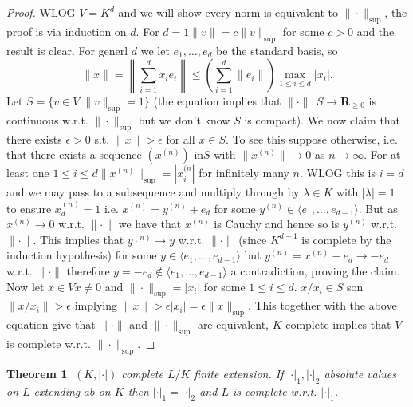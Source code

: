 \documentclass[10pt,]{book}
\newcommand{\gt}{>}
\theoremstyle{plain}
\newtheorem{theorem}{Theorem}[section]
\theoremstyle{definition}
\newcommand{\RR}{\mathbf{R}}
\newcommand{\ab}{|\cdot|}
\begin{document}
\begin{proof}

          WLOG \(V = K^d\) and we will show every norm is equivalent to \(\|\cdot\|_{\sup}\), the proof is via induction on \(d\).
          For \(d = 1\)\(\|v\| = c\|v\|_{\sup}\) for some \(c \gt 0\) and the result is clear.\newline{}
          For generl \(d\) we let \(e_1,\ldots,e_d\) be the standard basis, so
          \[
            \|x\| = \left\| \sum_{i=1}^d x_ie_i\right\| \le \left(\sum_{i=1}^d \|e_i\|\right)\max_{1\le i\le d}|x_i|.
          \]
          Let \(S = \{v\in V | \|v\|_{\sup} = 1\}\) (the equation  implies that \(\|\cdot\| \colon S\to \RR_{\ge 0}\) is continuous w.r.t. \(\|\cdot\|_{\sup}\) but we don't know \(S\) is compact).\newline{}
          We now claim that there exists \(\epsilon \gt 0\) s.t. \(\|x\| \gt \epsilon \) for all \(x\in S\).
          To see this suppose otherwise, i.e. that there exists a sequence \((x^{(n)})\) in\(S\) with \(\|x^(n) \|\to 0\) as \(n \to \infty\).
          For at least one \(1\le i \le d\)\(\|x^{(n)}\|_{\sup} = |x_i^{(n}|\) for infinitely many \(n\).
          WLOG this is \(i=d\) and we may pass to a subsequence and multiply through by \(\lambda\in K\) with \(|\lambda| = 1\) to ensure \(x_d^{(n)} = 1\) i.e. \(x^{(n)} = y^{(n)} + e_d \) for some \(y^{(n)} \in \langle e_1,\ldots,e_{d-1}\rangle\).
          But as \( x^{(n)} \to 0\) w.r.t. \(\|\cdot\|\) we have that \(x^{(n)}\) is Cauchy and hence so is \(y^{(n)}\) w.r.t. \(\|\cdot\|\).
          This implies that \(y^{(n)} \to y\) w.r.t. \(\|\cdot\|\) (since \(K^{d-1}\) is complete by the induction hypothesis) for some \(y \in \langle e_1,\ldots,e_{d-1}\rangle\) but \(y^{(n)} = x^{(n)} -e_d \to -e_d\) w.r.t. \(\|\cdot\|\) therefore \(y = -e_d \not\in \langle e_1,\ldots,e_{d-1}\rangle\) a  contradiction, proving the claim. \newline{}
          Now let \(x\in V\)\(x\ne 0\) and \(\|\cdot\|_{\sup}=|x_i|\) for some \(1\le i\le d\). 
          \(x/x_i\in S\) son \(\|x/x_i\|\gt \epsilon\) implying \(\|x\|\gt \epsilon |x_i | = \epsilon \|x\|_{\sup}\).
          This together with the above equation give that \(\|\cdot\|\) and \(\|\cdot\|_{\sup}\) are equivalent, \(K\) complete implies that \(V\) is complete w.r.t. \(\|\cdot\|_{\sup}\).
        \end{proof}
\begin{theorem}\label{theorem-8}
\((K,\ab)\) complete \(L/K\) finite extension.
          If \(\ab_1,\ab_2\) absolute values on \(L\) extending \(ab\) on \(K\) then \(\ab_1=\ab_2\) and \(L\) is complete w.r.t. \(\ab_1\).
        \end{theorem}
%
\backmatter
%
\end{document}
